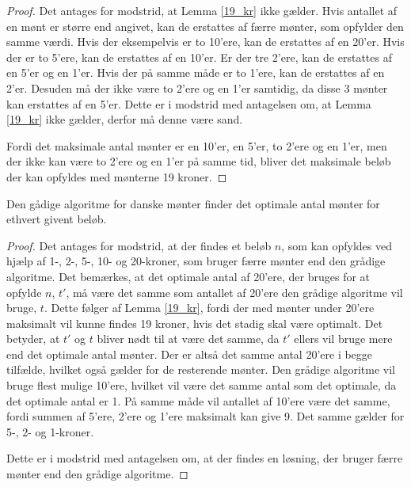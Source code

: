 \begin{proof}
\label{19_kr_bevis}
Det antages for modstrid, at Lemma \ref{19_kr} ikke gælder.
Hvis antallet af en mønt er større end angivet, kan de erstattes af færre mønter, som opfylder den samme værdi. 
Hvis der eksempelvis er to 10'ere, kan de erstattes af en 20'er. 
Hvis der er to 5'ere, kan de erstattes af en 10'er. 
Er der tre 2'ere, kan de erstattes af en 5'er og en 1'er. 
Hvis der på samme måde er to 1'ere, kan de erstattes af en 2'er.
Desuden må der ikke være to 2'ere og en 1'er samtidig, da disse 3 mønter kan erstattes af en 5'er. 
Dette er i modstrid med antagelsen om, at Lemma \ref{19_kr} ikke gælder, derfor må denne være sand. 

Fordi det maksimale antal mønter er en 10'er, en 5'er, to 2'ere og en 1'er, men der ikke kan være to 2'ere og en 1'er på samme tid, bliver det maksimale beløb der kan opfyldes med mønterne 19 kroner. 
\end{proof}

\begin{thm}
\label{gradig_satning}
Den gådige algoritme for danske mønter finder det optimale antal mønter for ethvert givent beløb.
\end{thm}

\begin{proof}
\label{gradig_bevis}
Det antages for modstrid, at der findes et beløb $n$, som kan opfyldes ved hjælp af 1-, 2-, 5-, 10- og 20-kroner, som bruger færre mønter end den grådige algoritme. 
Det bemærkes, at det optimale antal af 20'ere, der bruges for at opfylde $n$, $t'$, må være det samme som antallet af 20'ere den grådige algoritme vil bruge, $t$. 
Dette følger af Lemma \ref{19_kr}, fordi der med mønter under 20'ere maksimalt vil kunne findes 19 kroner, hvis det stadig skal være optimalt. 
Det betyder, at $t'$ og $t$ bliver nødt til at være det samme, da $t'$ ellers vil bruge mere end det optimale antal mønter. 
Der er altså det samme antal 20'ere i begge tilfælde, hvilket også gælder for de resterende mønter. 
Den grådige algoritme vil bruge flest mulige 10'ere, hvilket vil være det samme antal som det optimale, da det optimale antal er 1. 
På samme måde vil antallet af 10'ere være det samme, fordi summen af 5'ere, 2'ere og 1'ere maksimalt kan give 9.
Det samme gælder for 5-, 2- og 1-kroner.

Dette er i modstrid med antagelsen om, at der findes en løsning, der bruger færre mønter end den grådige algoritme.
\end{proof}

